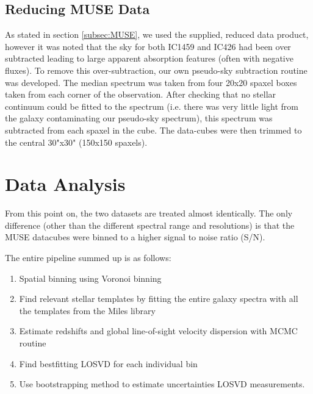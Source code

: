 	\subsection{Reducing MUSE Data}
		As stated in section \ref{subsec:MUSE}, we used the supplied, reduced data product, however it was noted that the sky for both IC1459 and IC426 had been over subtracted leading to large apparent absorption features (often with negative fluxes). To remove this over-subtraction, our own pseudo-sky subtraction routine was developed. The median spectrum was taken from four 20x20 spaxel boxes taken from each corner of the observation. After checking that no stellar continuum could be fitted to the spectrum (i.e. there was very little light from the galaxy contaminating our pseudo-sky spectrum), this spectrum was subtracted from each spaxel in the cube. The data-cubes were then trimmed to the central 30"x30" (150x150 spaxels).


\section{Data Analysis}
	\label{sec:analysis}
	From this point on, the two datasets are treated almost identically. The only difference (other than the different spectral range and resolutions) is that the MUSE datacubes were binned to a higher signal to noise ratio (S/N).



	The entire pipeline summed up is as follows:
	\begin{enumerate}
		\item Spatial binning using Voronoi binning
		\item Find relevant stellar templates by fitting the entire galaxy spectra with all the templates from the Miles library
		\item Estimate redshifts and global line-of-sight velocity dispersion with MCMC routine 
		\item Find bestfitting LOSVD for each individual bin
		\item Use bootstrapping method to estimate uncertainties LOSVD measurements. 
	\end{enumerate}





